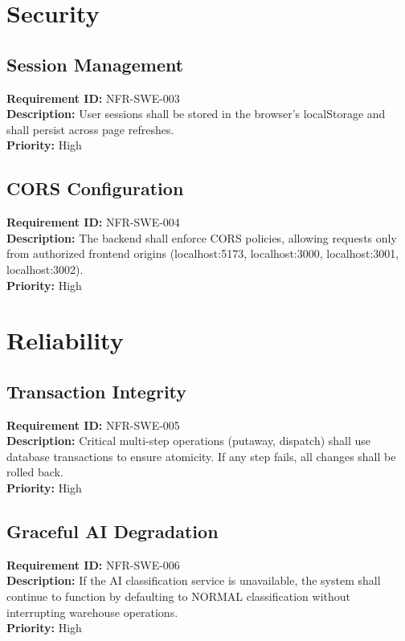 \documentclass[12pt,a4paper]{report}
\begin{document}
\section{Security}

\subsection{Session Management}
\noindent\textbf{Requirement ID:} NFR-SWE-003\\
\textbf{Description:} User sessions shall be stored in the browser's localStorage and shall persist across page refreshes.\\
\textbf{Priority:} High

\subsection{CORS Configuration}
\noindent\textbf{Requirement ID:} NFR-SWE-004\\
\textbf{Description:} The backend shall enforce CORS policies, allowing requests only from authorized frontend origins (localhost:5173, localhost:3000, localhost:3001, localhost:3002).\\
\textbf{Priority:} High

\section{Reliability}

\subsection{Transaction Integrity}
\noindent\textbf{Requirement ID:} NFR-SWE-005\\
\textbf{Description:} Critical multi-step operations (putaway, dispatch) shall use database transactions to ensure atomicity. If any step fails, all changes shall be rolled back.\\
\textbf{Priority:} High

\subsection{Graceful AI Degradation}
\noindent\textbf{Requirement ID:} NFR-SWE-006\\
\textbf{Description:} If the AI classification service is unavailable, the system shall continue to function by defaulting to NORMAL classification without interrupting warehouse operations.\\
\textbf{Priority:} High
\end{document}

